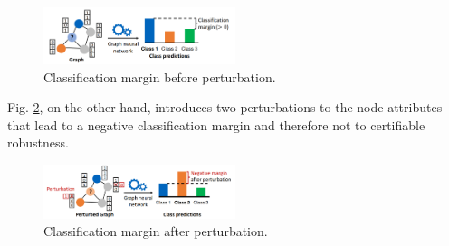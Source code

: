 \documentclass[a4paper,preprint]{sig-alternate}
\begin{document}
\begin{figure}[h]
    \centering
    \includegraphics[width=0.5\textwidth]{img/before_pert.png}
    \caption{Classification margin before perturbation. \cite{Zuegner_2019}}
    \label{fig:before_pert}
\end{figure}
Fig. \ref{fig:after_pert}, on the other hand, introduces two perturbations to the node attributes that lead to a negative
classification margin and therefore not to certifiable robustness.
\begin{figure}[h]
    \centering
    \includegraphics[width=0.5\textwidth]{img/after_pert.png}
    \caption{Classification margin after perturbation. \cite{Zuegner_2019}}
    \label{fig:after_pert}
\end{figure}
\end{document}
